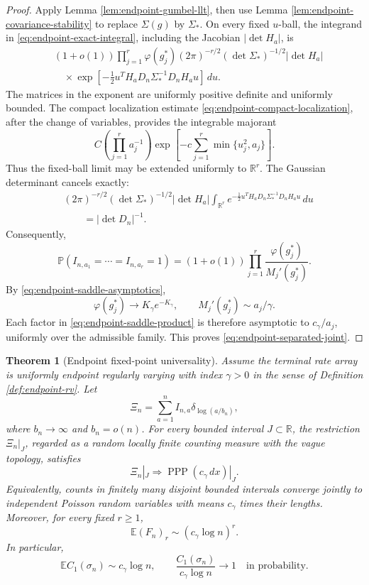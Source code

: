 \documentclass[11pt]{article}
\newtheorem{theorem}{Theorem}[section]
\theoremstyle{remark}
\newcommand{\Pp}{\mathbb P}
\newcommand{\Ee}{\mathbb E}
\newcommand{\PPP}{\operatorname{PPP}}
\newcommand{\dd}{\,d}
\begin{document}
\begin{proof}
Apply Lemma \ref{lem:endpoint-gumbel-llt}, then use Lemma
\ref{lem:endpoint-covariance-stability} to replace \(\Sigma(g)\) by
\(\Sigma_*\).  On every fixed \(u\)-ball, the integrand in
\eqref{eq:endpoint-exact-integral}, including the Jacobian
\(|\det H_a|\), is
\[
\begin{aligned}
&(1+o(1))\prod_{j=1}^r\varphi(g_j^*)
(2\pi)^{-r/2}(\det\Sigma_*)^{-1/2}|\det H_a|\\
&\quad\times
\exp\left[-\frac12u^TH_aD_n\Sigma_*^{-1}D_nH_au\right]\dd u.
\end{aligned}
\tag{8.38}\label{eq:endpoint-saddle-integrand}
\]
The matrices in the exponent are uniformly positive definite and uniformly
bounded.  The compact localization estimate
\eqref{eq:endpoint-compact-localization}, after the change of variables,
provides the integrable majorant
\[
        C\left(\prod_{j=1}^ra_j^{-1}\right)
        \exp\left[-c\sum_{j=1}^r\min\{u_j^2,a_j\}\right].
\]
Thus the fixed-ball limit may be extended uniformly to \(\mathbb R^r\).
The Gaussian determinant cancels exactly:
\[
\begin{aligned}
&(2\pi)^{-r/2}(\det\Sigma_*)^{-1/2}|\det H_a|
\int_{\mathbb R^r}
 e^{-\frac12u^TH_aD_n\Sigma_*^{-1}D_nH_au}\dd u\\
&\qquad=|\det D_n|^{-1}.
\end{aligned}
\tag{8.39}\label{eq:endpoint-determinant-cancellation}
\]
Consequently,
\[
\Pp(I_{n,a_1}=\cdots=I_{n,a_r}=1)
=(1+o(1))\prod_{j=1}^r
\frac{\varphi(g_j^*)}{M_j'(g_j^*)}.
\tag{8.40}\label{eq:endpoint-saddle-product}
\]
By \eqref{eq:endpoint-saddle-asymptotics},
\[
        \varphi(g_j^*)\longrightarrow
        K_\gamma e^{-K_\gamma},
        \qquad
        M_j'(g_j^*)\sim a_j/\gamma.
\]
Each factor in \eqref{eq:endpoint-saddle-product} is therefore asymptotic to
\(c_\gamma/a_j\), uniformly over the admissible family.  This proves
\eqref{eq:endpoint-separated-joint}.
\end{proof}


\begin{theorem}[Endpoint fixed-point universality]
\label{thm:endpoint-fixed-universality}
Assume the terminal rate array is uniformly endpoint regularly varying with
index \(\gamma>0\) in the sense of Definition \ref{def:endpoint-rv}.  Let
\[
        \Xi_n=\sum_{a=1}^n I_{n,a}\delta_{\log(a/b_n)},
\]
where \(b_n\to\infty\) and \(b_n=o(n)\).  For every bounded interval
\(J\subset\mathbb R\), the restriction \(\Xi_n|_J\), regarded as a random
locally finite counting measure with the vague topology, satisfies
\[
        \Xi_n|_J\Rightarrow \PPP(c_\gamma\dd x)|_J.
\tag{8.41}\label{eq:endpoint-ppp-limit}
\]
Equivalently, counts in finitely many disjoint bounded intervals converge
jointly to independent Poisson random variables with means \(c_\gamma\) times
their lengths.  Moreover, for every fixed \(r\ge1\),
\[
        \Ee(F_n)_r\sim(c_\gamma\log n)^r.
\tag{8.42}\label{eq:endpoint-factorial-moments}
\]
In particular,
\[
        \Ee C_1(\sigma_n)\sim c_\gamma\log n,
        \qquad
        \frac{C_1(\sigma_n)}{c_\gamma\log n}
        \longrightarrow1
        \quad\text{in probability}.
\tag{8.43}\label{eq:endpoint-fixed-lln}
\]
\end{theorem}
\end{document}
